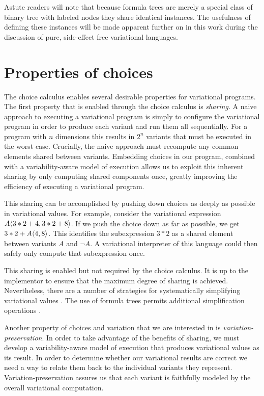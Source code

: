 \documentclass[12pt,oneside]{book}
\begin{document}
Astute readers will note that because formula trees are merely a special class of binary tree with
labeled nodes they share identical instances. The usefulness of defining these instances will be made
apparent further on in this work during the discussion of pure, side-effect free variational languages.

\section{Properties of choices}
\label{sec:props}

The choice calculus enables several desirable properties for variational programs.
The first property that is enabled through the choice calculus is \emph{sharing}. A naive approach to executing a variational program is simply to
configure the variational program in order to produce each variant and run them all sequentially.
For a program with $n$ dimensions this results in $2^n$ variants that must be executed in the worst case. Crucially,
the naive approach must recompute any common elements shared between variants. Embedding
choices in our program, combined with a variability-aware model of execution allows us to exploit this
inherent sharing by only computing shared components once, greatly improving the efficiency of
executing a variational program.

This sharing can be accomplished by pushing down choices as deeply as possible in variational
values. For example, consider the variational expression $A \langle 3*2+4, 3*2+8 \rangle$. If we push
the choice down as far as possible, we get $3*2+A \langle 4, 8 \rangle$. This identifies the subexpression
$3*2$ as a shared element between variants $A$ and $\neg A$. A variational interpreter of this
language could then safely only compute that subexpression once.

This sharing is enabled but not required by the choice calculus. It is up to the implementor to
ensure that the maximum degree of sharing is achieved. Nevertheless, there are a number of
strategies for systematically simplifying variational values \cite{Walk13thesis}. The use of formula
trees permits additional simplification operations \cite{HW16fosd,WO14gpce}.

Another property of choices and variation that we are interested in is \emph{variation-preservation}. In order
to take advantage of the benefits of sharing, we must develop a variability-aware model of execution
that produces variational values as its result. In order to determine whether our variational results
are correct we need a way to relate them back to the individual variants they represent.
Variation-preservation assures us that each variant is faithfully modeled by the overall variational computation.
\end{document}
